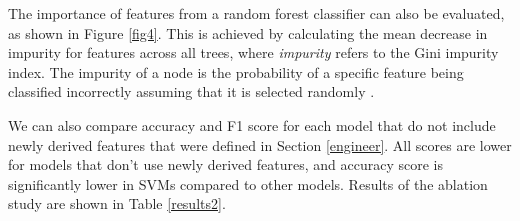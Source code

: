 The importance of features from a random forest classifier can also be evaluated, as shown in Figure \ref{fig4}. This is achieved by calculating the mean decrease in impurity for features across all trees, where \textit{impurity} refers to the Gini impurity index. The impurity of a node is the probability of a specific feature being classified incorrectly assuming that it is selected randomly \cite{cassidy2014calculating}.


We can also compare accuracy and F1 score for each model that do not include newly derived features that were defined in Section \ref{engineer}. All scores are lower for models that don't use newly derived features, and accuracy score is significantly lower in SVMs compared to other models. Results of the ablation study are shown in Table \ref{results2}.

\begin{table}[ht]
\caption{Model performance with and without newly derived features}
\label{results2}
\centering
\setlength{\tabcolsep}{8pt}
\end{table}